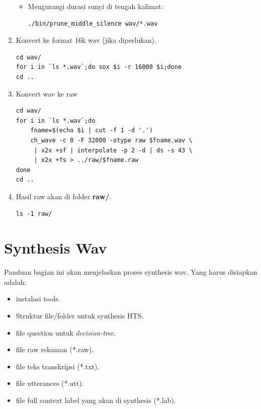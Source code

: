 \documentclass[12pt,]{article}
\begin{document}
\begin{enumerate}
\begin{itemize}
			\item Mengurangi durasi sunyi di tengah kalimat:
			\begin{verbatim}
./bin/prune_middle_silence wav/*.wav
			\end{verbatim}
			
		\end{itemize}
	
		\item Konvert ke format 16k wav (jika diperlukan).
		\begin{verbatim}
cd wav/
for i in `ls *.wav`;do sox $i -r 16000 $i;done
cd ..
		\end{verbatim}
		
		\newpage
		\item Konvert wav ke raw
		\begin{verbatim}
cd wav/
for i in `ls *.wav`;do
	fname=$(echo $i | cut -f 1 -d '.')
	ch_wave -c 0 -F 32000 -otype raw $fname.wav \
	 | x2x +sf | interpolate -p 2 -d | ds -s 43 \
	 | x2x +fs > ../raw/$fname.raw
done
cd ..
		\end{verbatim}
		
		\item Hasil raw akan di folder \textbf{raw/}.
		\begin{verbatim}
ls -1 raw/
		\end{verbatim}
		
	\end{enumerate}

	\newpage
	\section{Synthesis Wav}
	
	Panduan bagian ini akan menjelaskan proses synthesis wav.
	Yang harus disiapkan adalah:
	\begin{itemize}
		\item instalasi tools.
		
		\item Struktur file/folder untuk synthesis HTS.
		
		\item file question untuk \textit{decision-tree}.
		
		\item file raw rekaman (*.raw).
		
		\item file teks transkripsi (*.txt).
		
		\item file utterances (*.utt).
		
		\item file full context label yang akan di synthesis (*.lab).
	\end{itemize}
	
\end{document}
